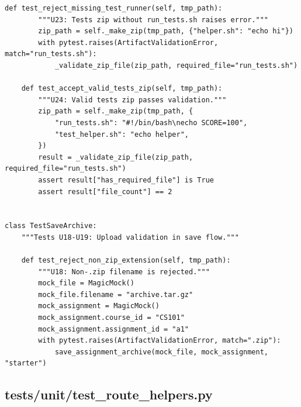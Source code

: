 \documentclass[12pt, letterpaper]{article}
\begin{document}
\begin{lstlisting}[style=pythonstyle]
    def test_reject_missing_test_runner(self, tmp_path):
        """U23: Tests zip without run_tests.sh raises error."""
        zip_path = self._make_zip(tmp_path, {"helper.sh": "echo hi"})
        with pytest.raises(ArtifactValidationError, match="run_tests.sh"):
            _validate_zip_file(zip_path, required_file="run_tests.sh")

    def test_accept_valid_tests_zip(self, tmp_path):
        """U24: Valid tests zip passes validation."""
        zip_path = self._make_zip(tmp_path, {
            "run_tests.sh": "#!/bin/bash\necho SCORE=100",
            "test_helper.sh": "echo helper",
        })
        result = _validate_zip_file(zip_path, required_file="run_tests.sh")
        assert result["has_required_file"] is True
        assert result["file_count"] == 2


class TestSaveArchive:
    """Tests U18-U19: Upload validation in save flow."""

    def test_reject_non_zip_extension(self, tmp_path):
        """U18: Non-.zip filename is rejected."""
        mock_file = MagicMock()
        mock_file.filename = "archive.tar.gz"
        mock_assignment = MagicMock()
        mock_assignment.course_id = "CS101"
        mock_assignment.assignment_id = "a1"
        with pytest.raises(ArtifactValidationError, match=".zip"):
            save_assignment_archive(mock_file, mock_assignment, "starter")
\end{lstlisting}

\subsection{tests/unit/test\_route\_helpers.py}
\end{document}
